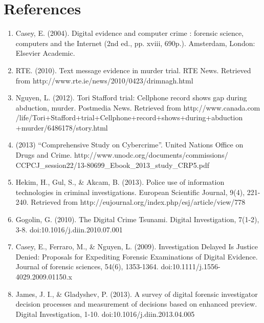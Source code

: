 \documentclass[10pt,a4paper]{article}
\begin{document}
\section*{References}
\begin{enumerate}
\item Casey, E. (2004). Digital evidence and computer crime : forensic science, computers and the Internet (2nd ed., pp. xviii, 690p.). Amsterdam, London: Elsevier Academic.
\item RTE. (2010). Text message evidence in murder trial. RTE News. Retrieved from http://www.rte.ie/news/2010/0423/drimnagh.html
\item Nguyen, L. (2012). Tori Stafford trial: Cellphone record shows gap during abduction, murder. Postmedia News. Retrieved from http://www.canada.com\\/life/Tori+Stafford+trial+Cellphone+record+shows+during+abduction\\+murder/6486178/story.html
\item (2013) ``Comprehensive Study on Cybercrime''. United Nations Office on Drugs and Crime. http://www.unodc.org/documents/commissions/\\CCPCJ\_session22/13-80699\_Ebook\_2013\_study\_CRP5.pdf
\item Hekim, H., Gul, S., \& Akcam, B. (2013). Police use of information technologies in criminal investigations. European Scientific Journal, 9(4), 221-240. Retrieved from http://eujournal.org/index.php/esj/article/view/778
\item Gogolin, G. (2010). The Digital Crime Tsunami. Digital Investigation, 7(1-2), 3-8. doi:10.1016/j.diin.2010.07.001
\item Casey, E., Ferraro, M., \& Nguyen, L. (2009). Investigation Delayed Is Justice Denied: Proposals for Expediting Forensic Examinations of Digital Evidence. Journal of forensic sciences, 54(6), 1353-1364. doi:10.1111/j.1556-4029.2009.01150.x
\item James, J. I., \& Gladyshev, P. (2013). A survey of digital forensic investigator decision processes and measurement of decisions based on enhanced preview. Digital Investigation, 1-10. doi:10.1016/j.diin.2013.04.005
\end{enumerate}
\end{document}
